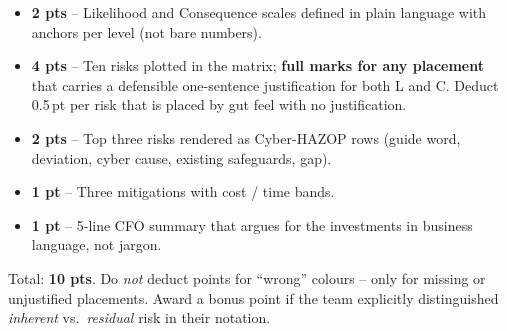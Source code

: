 \documentclass[11pt,a4paper]{article}
\begin{document}
\begin{rubricbox}
\begin{itemize}[leftmargin=*, nosep]
  \item \textbf{2 pts} -- Likelihood and Consequence scales defined in plain language with anchors per level (not bare numbers).
  \item \textbf{4 pts} -- Ten risks plotted in the matrix; \textbf{full marks for any placement} that carries a defensible one-sentence justification for both L and C. Deduct 0.5\,pt per risk that is placed by gut feel with no justification.
  \item \textbf{2 pts} -- Top three risks rendered as Cyber-HAZOP rows (guide word, deviation, cyber cause, existing safeguards, gap).
  \item \textbf{1 pt} -- Three mitigations with cost / time bands.
  \item \textbf{1 pt} -- 5-line CFO summary that argues for the investments in business language, not jargon.
\end{itemize}
Total: \textbf{10 pts}. Do \emph{not} deduct points for ``wrong'' colours -- only for missing or unjustified placements. Award a bonus point if the team explicitly distinguished \emph{inherent} vs.\ \emph{residual} risk in their notation.
\end{rubricbox}
\end{document}

